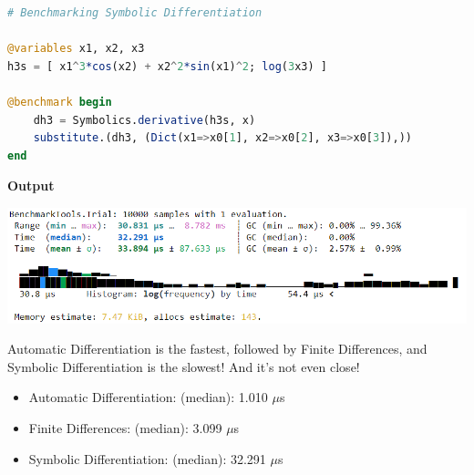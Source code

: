 \begin{lstlisting}[language=Julia,style=mystyle]
# Benchmarking Symbolic Differentiation

@variables x1, x2, x3
h3s = [ x1^3*cos(x2) + x2^2*sin(x1)^2; log(3x3) ]

@benchmark begin
    dh3 = Symbolics.derivative(h3s, x)
    substitute.(dh3, (Dict(x1=>x0[1], x2=>x0[2], x3=>x0[3]),))
end

\end{lstlisting}
\textbf{Output}

\includegraphics[width=0.9\columnwidth]{graphics/Chap10/BenchmarkSymbolicDiff.png}

\vspace*{.2cm}

\begin{tcolorbox}[title = {\large \bf Summary}]
Automatic Differentiation is the fastest, followed by Finite Differences, and Symbolic Differentiation is the slowest! And it's not even close!
\begin{itemize}
    \item Automatic Differentiation: (median): 1.010 $\mu$s 
    \item Finite Differences: (median): 3.099 $\mu$s 
    \item Symbolic Differentiation: (median): 32.291 $\mu$s 
\end{itemize}
\end{tcolorbox}







